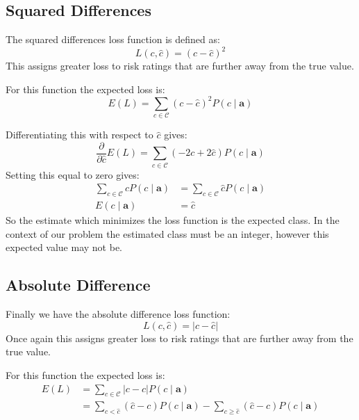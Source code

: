 \subsection{Squared Differences}
The squared differences loss function is defined as:
\begin{equation}
	L(c, \hat{c}) = (c - \hat{c})^2
\end{equation}
This assigns greater loss to risk ratings that are further away from the true value.

For this function the expected loss is:
\begin{equation}
	E(L) = \sum_{c \in \mathcal{C}} (c - \hat{c})^2P(c \mid \mathbf{a}) 
\end{equation}

Differentiating this with respect to $\hat{c}$ gives:
\begin{equation}
	\frac{\partial}{\partial \hat{c}} E(L) = \sum_{c \in \mathcal{C}} (-2c + 2\hat{c})P(c \mid \mathbf{a}) 
\end{equation}
Setting this equal to zero gives:
\begin{align}
	\sum_{c \in \mathcal{C}} cP(c \mid \mathbf{a}) & = \sum_{c \in \mathcal{C}} \hat{c}P(c \mid \mathbf{a}) \\
	E(c \mid \mathbf{a}) & = \hat{c}
\end{align}
So the estimate which minimizes the loss function is the expected class.
In the context of our problem the estimated class must be an integer, however this expected value may not be.

\subsection{Absolute Difference}
Finally we have the absolute difference loss function:
\begin{equation}
	L(c, \hat{c}) = | c - \hat{c} |
\end{equation}
Once again this assigns greater loss to risk ratings that are further away from the true value.

For this function the expected loss is:
\begin{align}
	E(L) & = \sum_{c \in \mathcal{C}} |c - \hat{c}|P(c \mid \mathbf{a}) \\
	     & = \sum_{c < \hat{c}} (\hat{c} - c)P(c \mid \mathbf{a}) - \sum_{c \geq \hat{c}} (\hat{c} - c)P(c \mid \mathbf{a})
\end{align}

